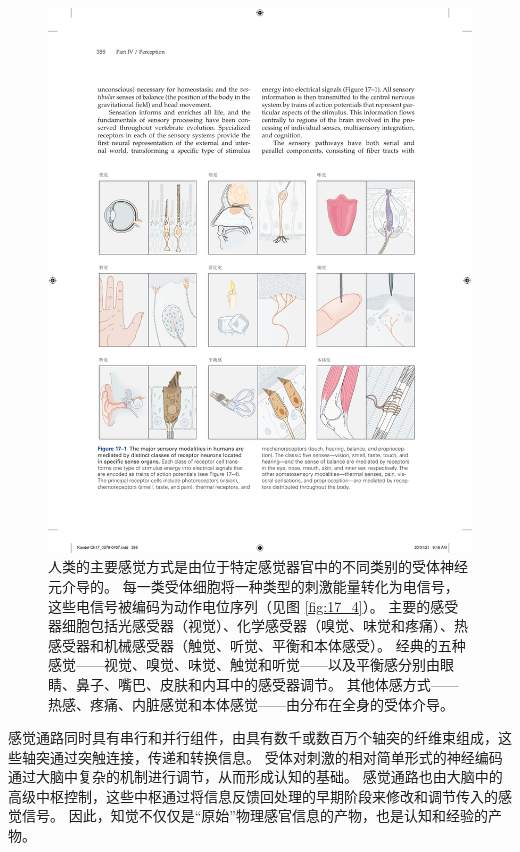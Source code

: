 \begin{figure}[htbp]
	\centering
	\includegraphics[width=1.0\linewidth]{chap17/fig_17_1}
	\caption{人类的主要感觉方式是由位于特定感觉器官中的不同类别的受体神经元介导的。 
		每一类受体细胞将一种类型的刺激能量转化为电信号，这些电信号被编码为动作电位序列（见图 \ref{fig:17_4}）。 
		主要的感受器细胞包括光感受器（视觉）、化学感受器（嗅觉、味觉和疼痛）、热感受器和机械感受器（触觉、听觉、平衡和本体感受）。 
		经典的五种感觉——视觉、嗅觉、味觉、触觉和听觉——以及平衡感分别由眼睛、鼻子、嘴巴、皮肤和内耳中的感受器调节。 
		其他体感方式——热感、疼痛、内脏感觉和本体感觉——由分布在全身的受体介导。}
	\label{fig:17_1}
\end{figure}



感觉通路同时具有串行和并行组件，由具有数千或数百万个轴突的纤维束组成，这些轴突通过突触连接，传递和转换信息。 
受体对刺激的相对简单形式的神经编码通过大脑中复杂的机制进行调节，从而形成认知的基础。 
感觉通路也由大脑中的高级中枢控制，这些中枢通过将信息反馈回处理的早期阶段来修改和调节传入的感觉信号。 
因此，知觉不仅仅是“原始”物理感官信息的产物，也是认知和经验的产物。


